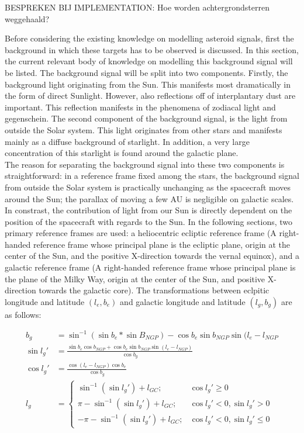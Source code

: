 BESPREKEN BIJ IMPLEMENTATION: Hoe worden achtergrondsterren weggehaald?

Before considering the existing knowledge on modelling asteroid signals, first the background in which these targets has to be observed is discussed. In this section, the current relevant body of knowledge on modelling this background signal will be listed. The background signal will be split into two components. Firstly, the background light originating from the Sun. This manifests most dramatically in the form of direct Sunlight. However, also reflections off of interplantary dust are important. This reflection manifests in the phenomena of zodiacal light and gegenschein. The second component of the background signal, is the light from outside the Solar system. This light originates from other stars and manifests mainly as a diffuse background of starlight. In addition, a very large concentration of this starlight is found around the galactic plane. \\

The reason for separating the background signal into these two components is straightforward: in a reference frame fixed among the stars, the background signal from outside the Solar system is practically unchanging as the spacecraft moves around the Sun; the parallax of moving a few AU is negligible on galactic scales. In constrast, the contribution of light from our Sun is directly dependent on the position of the spacecraft with regards to the Sun. In the following sections, two primary reference frames are used: a heliocentric ecliptic reference frame (A right-handed reference frame whose principal plane is the ecliptic plane, origin at the center of the Sun, and the positive X-direction towards the vernal equinox), and a galactic reference frame (A right-handed reference frame whose principal plane is the plane of the Milky Way, origin at the center of the Sun, and positive X-direction towards the galactic core). The transformations between eclpitic longitude and latitude $(l_e, b_e)$ and galactic longitude and latitude $(l_g, b_g)$ are as follows:

\begin{align}
 b_g &= \sin ^{-1} (\sin b_e * \sin B_{NGP}) - \cos b_e \sin b_{NGP} \sin (l_e - l_{NGP} \\
 \sin l_g' &= \frac{\sin b_e \cos b_{NGP} + \cos b_e \sin b_{NGP} \sin (l_e - l_{NGP})}{\cos b_g} \\
 \cos l_g' &= \frac{\cos (l_e - l_{NGP}) \cos b_e}{\cos b_g} \\
 l_g &= \begin{cases}
        \sin ^{-1} (\sin l_g') + l_{GC}; & \cos l_g' \geq 0 \\
        \pi - \sin^{-1} (\sin l_g') + l_{GC}; & \cos l_g' < 0, \sin l_g' > 0 \\
        - \pi - \sin^{-1} (\sin l_g') + l_{GC}; & \cos l_g' < 0, \sin l_g' \leq 0
       \end{cases}
\end{align}

